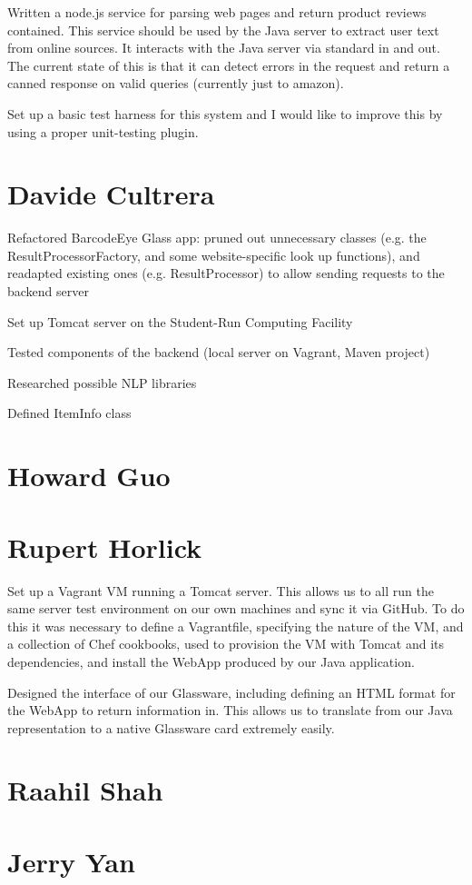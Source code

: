 \documentclass[12pt,a4paper]{report}
\begin{document}
Written a node.js service for parsing web pages and return product reviews contained. This service should be used by the Java server to extract user text from online sources. It interacts with the Java server via standard in and out. The current state of this is that it can detect errors in the request and return a canned response on valid queries (currently just to amazon). 

Set up a basic test harness for this system and I would like to improve this by using a proper unit-testing plugin.

\section{Davide Cultrera}

Refactored BarcodeEye Glass app: pruned out unnecessary classes (e.g. the ResultProcessorFactory, and some website-specific look up functions), and readapted existing ones (e.g. ResultProcessor) to allow sending requests to the backend server

Set up Tomcat server on the Student-Run Computing Facility

Tested components of the backend (local server on Vagrant, Maven project)

Researched possible NLP libraries

Defined ItemInfo class


\section{Howard Guo}

\section{Rupert Horlick}

Set up a Vagrant VM running a Tomcat server. This allows us to all run the same server test environment on our own machines and sync it via GitHub. To do this it was necessary to define a Vagrantfile, specifying the nature of the VM, and a collection of Chef cookbooks, used to provision the VM with Tomcat and its dependencies, and install the WebApp produced by our Java application.

Designed the interface of our Glassware, including defining an HTML format for the WebApp to return information in. This allows us to translate from our Java representation to a native Glassware card extremely easily.

\section{Raahil Shah}

\section{Jerry Yan}
\end{document}
